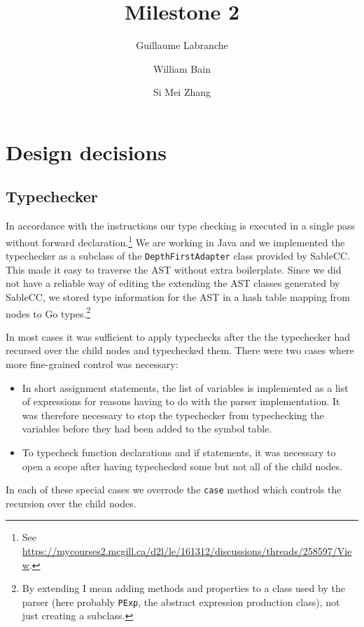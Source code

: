 \documentclass[oneside]{article}
\begin{document}
\title{Milestone 2}
\author{Guillaume Labranche \and William Bain \and Si Mei Zhang}
\maketitle

\tableofcontents

\section{Design decisions}

\subsection{Typechecker}

In accordance with the instructions our type checking is executed in a single pass without forward declaration.\footnote{See \url{https://mycourses2.mcgill.ca/d2l/le/161312/discussions/threads/258597/View}.} We are working in Java and we implemented the typechecker as a subclass of the \verb|DepthFirstAdapter| class provided by SableCC. This made it easy to traverse the AST without extra boilerplate. Since we did not have a reliable way of editing the extending the AST classes generated by SableCC, we stored type information for the AST in a hash table mapping from nodes to Go types.\footnote{By extending I mean adding methods and properties to a class used by the parser (here probably \texttt{PExp}, the abstract expression production class), not just creating a subclass.}

In most cases it was sufficient to apply typechecks after the the typechecker had recursed over the child nodes and typechecked them. There were two cases where more fine-grained control was necessary:

\begin{itemize}
    \item In short assignment statements, the list of variables is implemented as a list of expressions for reasons having to do with the parser implementation. It was therefore necessary to stop the typechecker from typechecking the variables before they had been added to the symbol table.
    \item To typecheck function declarations and if statements, it was necessary to open a scope after having typechecked some but not all of the child nodes.
\end{itemize}

In each of these special cases we overrode the \verb|case| method which controls the recursion over the child nodes.
\end{document}
